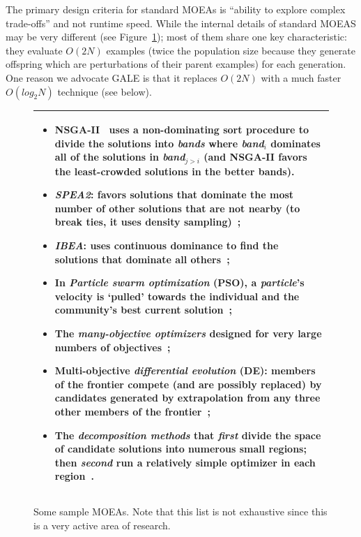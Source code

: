 \documentclass[journal]{IEEEtran}
\newcommand{\bi}{\begin{itemize}}
\newcommand{\ei}{\end{itemize}}
\newcommand{\fig}[1]{Figure~\ref{fig:#1}}
\begin{document}
The primary design criteria for standard MOEAs is ``ability to explore complex trade-offs''
and not runtime speed.
While the internal details of standard MOEAS may be very different (see \fig{sample}); most of them share one key characteristic:
they evaluate $O(2N)$ examples (twice the population size because they generate offspring which are perturbations of their parent examples) for each generation.  One reason we advocate GALE is that it replaces
 $O(2N)$  with  a much faster $O(log_2N)$ technique (see below).


\begin{figure}
\begin{tabular}{|p{.95\linewidth}|}\hline
\small
\bi
\item NSGA-II~\cite{deb00afast} 
uses a non-dominating sort procedure to divide the solutions into {\em bands} where {\em band}$_i$ dominates all of the solutions in {\em band}$_{j>i}$ (and NSGA-II favors the
least-crowded solutions in the better bands).
\item
{\em SPEA2}: favors solutions that dominate the most number of other solutions that are not nearby (to break ties, it uses density sampling)~\cite{zit02}; 
\item {\em  IBEA}:
uses continuous dominance to find the solutions that dominate all others~\cite{Zitzler04indicator-basedselection}; 
\item In {\em Particle swarm optimization} (PSO), a {\em particle}'s velocity is `pulled' towards the individual and the community's best current solution~\cite{pan08};
\item 
The {\em many-objective optimizers} designed for very large numbers of objectives~\cite{deb14}; 
\item
Multi-objective {\em differential evolution} (DE): members of the frontier compete (and are possibly replaced) by candidates generated by extrapolation from any three other members of the frontier~\cite{storn97,5601760};
\item
The {\em decomposition methods} that {\em first} divide the space of candidate solutions into numerous small regions; then {\em second} run a relatively simple optimizer in
each region~\cite{deb05,zhang07}.
\ei \\\hline
\end{tabular}
\caption{Some sample MOEAs. Note that this list is not exhaustive since this is a very active area of research.}\label{fig:sample}
\end{figure}
\end{document}
